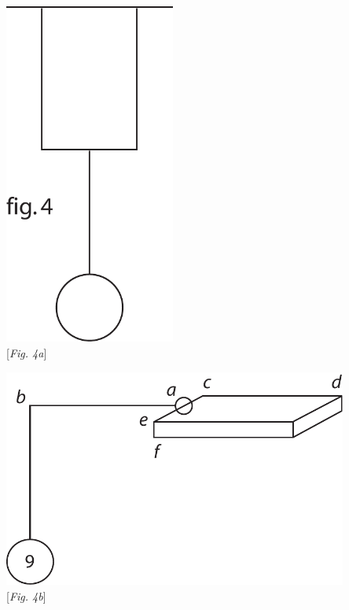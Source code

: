 \begin{minipage}[t]{0.4\textwidth}
\noindent
\centering
\hspace{-10mm}
\includegraphics[width=0.42\textwidth]{images/LH037,04_051-052d-4.pdf}\\
\centering
\vspace*{0.5em}
\hspace{-10mm}
[\textit{Fig. 4a}]
\end{minipage}
\begin{minipage}[t]{0.6\textwidth}
\noindent
\includegraphics[width=0.85\textwidth]{images/LH037,04_051-052d-5.pdf}\\
\centering
\vspace*{0.5em}
\hspace{0mm}
[\textit{Fig. 4b}]
\end{minipage}
